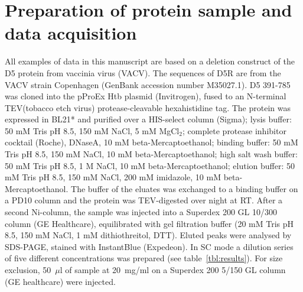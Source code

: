 \documentclass[preprint,pdf]{iucr}              %
\begin{document}
\appendix
{}






\section{Preparation of protein sample and data acquisition}
All examples of data in this manuscript are based on a deletion construct of
the D5 protein from vaccinia virus (VACV).
The sequences of D5R are from the VACV strain Copenhagen (GenBank accession
number M35027.1).
D5 391-785 was cloned into the pProEx Htb plasmid (Invitrogen), fused to an N-terminal
TEV(tobacco etch virus) protease-cleavable hexahistidine tag. The protein was expressed in
BL21* and purified over a HIS-select column (Sigma); lysis buffer: 50 mM Tris
pH 8.5, 150 mM NaCl, 5 mM MgCl$_{2}$; complete protease inhibitor cocktail
(Roche), DNaseA, 10 mM beta-Mercaptoethanol; binding buffer: 50 mM Tris pH 8.5, 150 mM NaCl, 10 mM beta-Mercaptoethanol; 
high salt wash buffer: 50 mM Tris pH 8.5, 1 M NaCl, 10 mM beta-Mercaptoethanol; 
elution buffer: 50 mM Tris pH 8.5, 150 mM NaCl,  200 mM imidazole, 10 mM beta-Mercaptoethanol. 
The buffer of the eluates was exchanged to a binding buffer on a PD10 column and
the protein was TEV-digested over night at RT. 
After a second Ni-column, the sample was injected into a 
Superdex 200 GL 10/300 column (GE Healthcare), equilibrated with gel filtration
buffer (20 mM Tris pH 8.5, 150 mM NaCl, 1 mM dithiothreitol, DTT). 
Eluted peaks were analysed by 
SDS-PAGE, stained with InstantBlue (Expedeon).
In SC mode a dilution series of five different concentrations
was prepared (see table~\ref{tbl:results}). 
For size exclusion, 50~$\mu$l of sample at 20~mg/ml on a Superdex
200 5/150 GL column (GE healthcare) were injected.
\end{document}
